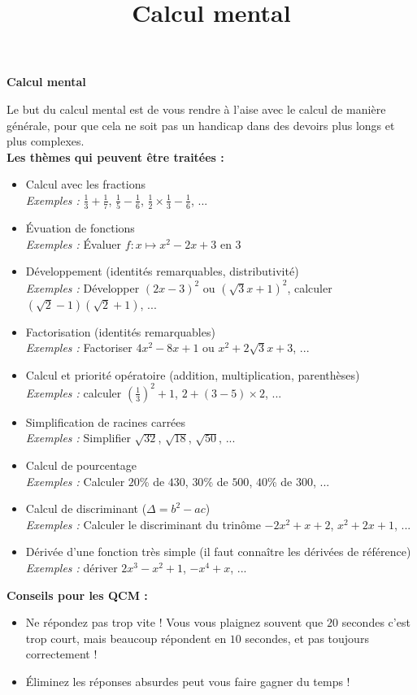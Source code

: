 \documentclass[11pt]{article}
\title{Calcul mental}
\date{}
\author{}
\begin{document}
\begin{center}
  \LARGE \textbf{Calcul mental}
\end{center}
Le but du calcul mental est de vous rendre à l'aise avec le calcul de manière
générale, pour que cela ne soit pas un handicap dans des devoirs plus longs et
plus complexes.\\[1cm]
\textbf{Les thèmes qui peuvent être traitées :}
\begin{itemize}
  \item Calcul avec les fractions\\
    \emph{Exemples :} $\frac{1}{3}+\frac{1}{7}$, $\frac{1}{5}-\frac{1}{6}$,
    $\frac{1}{2}\times\frac{1}{3}-\frac{1}{6}$, ...
  \item Évuation de fonctions\\
    \emph{Exemples :} Évaluer $f:x\mapsto x^2-2x+3$ en $3$
  \item Développement (identités remarquables, distributivité)\\
    \emph{Exemples :} Développer $(2x-3)^2$ ou $(\sqrt3x+1)^2$, calculer
    $(\sqrt2-1)(\sqrt2+1)$, ...
  \item Factorisation (identités remarquables)\\
    \emph{Exemples :} Factoriser $4x^2-8x+1$ ou $x^2+2\sqrt3x+3$, ...
  \item Calcul et priorité opératoire (addition, multiplication, parenthèses)\\
    \emph{Exemples :} calculer $\left(  \frac{1}{3}\right)^2+1$,
    $2+(3-5)\times2$, ...
  \item Simplification de racines carrées\\
    \emph{Exemples :} Simplifier $\sqrt{32}$, $\sqrt{18}$, $\sqrt{50}$, ...
  \item Calcul de pourcentage\\
    \emph{Exemples :} Calculer $20$\% de $430$, $30$\% de $500$, $40$\% de $300$, ...
  \item Calcul de discriminant ($\Delta=b^2-ac$)\\
    \emph{Exemples :} Calculer le discriminant du trinôme $-2x^2+x+2$,
    $x^2+2x+1$, ...
  \item Dérivée d'une fonction très simple (il faut connaître les dérivées de
    référence)\\
    \emph{Exemples :} dériver $2x^3-x^2+1$, $-x^4+x$, ...
\end{itemize}
\textbf{Conseils pour les QCM :}
\begin{itemize}
  \item Ne répondez pas trop vite ! Vous vous plaignez souvent que $20$ secondes
    c'est trop court, mais beaucoup répondent en $10$ secondes, et pas toujours
    correctement !
  \item Éliminez les réponses absurdes peut vous faire gagner du temps !
\end{itemize}
\end{document}
